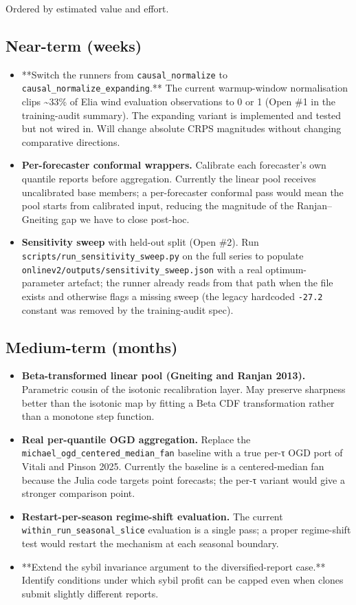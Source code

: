 \documentclass[11pt,a4paper,openany]{report}
\begin{document}
Ordered by estimated value and effort.

\subsection{Near-term (weeks)}

\begin{itemize}
  \item **Switch the runners from \texttt{causal\_normalize} to
    \texttt{causal\_normalize\_expanding}.** The current warmup-window
    normalisation clips \textasciitilde{}33\% of Elia wind evaluation observations to 0
    or 1 (Open \#1 in the training-audit summary). The expanding variant
    is implemented and tested but not wired in. Will change absolute
    CRPS magnitudes without changing comparative directions.
  \item \textbf{Per-forecaster conformal wrappers.} Calibrate each forecaster's
    own quantile reports before aggregation. Currently the linear pool
    receives uncalibrated base members; a per-forecaster conformal pass
    would mean the pool starts from calibrated input, reducing the
    magnitude of the Ranjan–Gneiting gap we have to close post-hoc.
  \item \textbf{Sensitivity sweep} with held-out split (Open \#2). Run
    \texttt{scripts/run\_sensitivity\_sweep.py} on the full series to populate
    \texttt{onlinev2/outputs/sensitivity\_sweep.json} with a real optimum-
    parameter artefact; the runner already reads from that path when
    the file exists and otherwise flags a missing sweep (the legacy
    hardcoded \texttt{-27.2} constant was removed by the training-audit spec).
\end{itemize}

\subsection{Medium-term (months)}

\begin{itemize}
  \item \textbf{Beta-transformed linear pool (Gneiting and Ranjan 2013).}
    Parametric cousin of the isotonic recalibration layer. May preserve
    sharpness better than the isotonic map by fitting a Beta CDF
    transformation rather than a monotone step function.
  \item \textbf{Real per-quantile OGD aggregation.} Replace the
    \texttt{michael\_ogd\_centered\_median\_fan} baseline with a true per-τ OGD
    port of Vitali and Pinson 2025. Currently the baseline is a
    centered-median fan because the Julia code targets point forecasts;
    the per-τ variant would give a stronger comparison point.
  \item \textbf{Restart-per-season regime-shift evaluation.} The current
    \texttt{within\_run\_seasonal\_slice} evaluation is a single pass; a proper
    regime-shift test would restart the mechanism at each seasonal
    boundary.
  \item **Extend the sybil invariance argument to the diversified-report
    case.** Identify conditions under which sybil profit can be capped
    even when clones submit slightly different reports.
\end{itemize}
\end{document}
